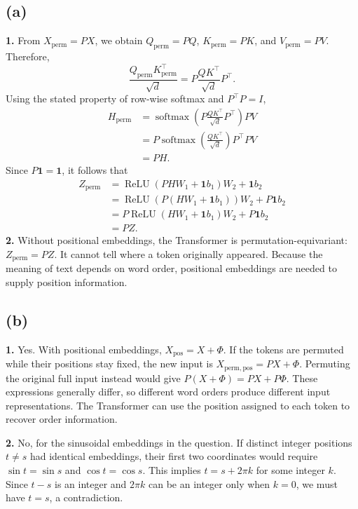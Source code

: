\documentclass[a4paper,10pt]{article}
\begin{document}
\subsection{(a)}
\noindent\textbf{1.} From \(X_{\mathrm{perm}}=PX\), we obtain \(Q_{\mathrm{perm}}=PQ\), \(K_{\mathrm{perm}}=PK\), and \(V_{\mathrm{perm}}=PV\). Therefore,
\[
\frac{Q_{\mathrm{perm}}K_{\mathrm{perm}}^\top}{\sqrt d}
=P\frac{QK^\top}{\sqrt d}P^\top.
\]
Using the stated property of row-wise softmax and \(P^\top P=I\),
\[
\begin{aligned}
H_{\mathrm{perm}}
&=\operatorname{softmax}\left(P\frac{QK^\top}{\sqrt d}P^\top\right)PV \\
&=P\operatorname{softmax}\left(\frac{QK^\top}{\sqrt d}\right)P^\top PV \\
&=PH.
\end{aligned}
\]
Since \(P\mathbf{1}=\mathbf{1}\), it follows that
\[
\begin{aligned}
Z_{\mathrm{perm}}
&=\operatorname{ReLU}(PHW_1+\mathbf{1}b_1)W_2+\mathbf{1}b_2 \\
&=\operatorname{ReLU}\left(P(HW_1+\mathbf{1}b_1)\right)W_2+P\mathbf{1}b_2 \\
&=P\operatorname{ReLU}(HW_1+\mathbf{1}b_1)W_2+P\mathbf{1}b_2 \\
&=PZ.
\end{aligned}
\]
\noindent\textbf{2.} Without positional embeddings, the Transformer is permutation-equivariant: \(Z_{\mathrm{perm}}=PZ\). It cannot tell where a token originally appeared. Because the meaning of text depends on word order, positional embeddings are needed to supply position information.

\subsection{(b)}
\noindent\textbf{1.} Yes. With positional embeddings, \(X_{\mathrm{pos}}=X+\Phi\). If the tokens are permuted while their positions stay fixed, the new input is \(X_{\mathrm{perm,pos}}=PX+\Phi\). Permuting the original full input instead would give \(P(X+\Phi)=PX+P\Phi\). These expressions generally differ, so different word orders produce different input representations. The Transformer can use the position assigned to each token to recover order information.

\noindent\textbf{2.} No, for the sinusoidal embeddings in the question. If distinct integer positions \(t\ne s\) had identical embeddings, their first two coordinates would require \(\sin t=\sin s\) and \(\cos t=\cos s\). This implies \(t=s+2\pi k\) for some integer \(k\). Since \(t-s\) is an integer and \(2\pi k\) can be an integer only when \(k=0\), we must have \(t=s\), a contradiction.
\end{document}

